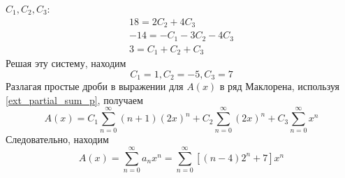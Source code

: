 \begin{task}
\begin{solution}
        $C_1, C_2, C_3$:
        \begin{gather*}
            18 = 2C_2 + 4C_3 \\
            -14 = -C_1 - 3C_2 - 4C_3 \\
            3 = C_1 + C_2 + C_3
        \end{gather*}
        Решая эту систему, находим
        \begin{equation*}
            C_1 = 1, C_2 = -5, C_3 = 7
        \end{equation*}
        Разлагая простые дроби в выражении для $A(x)$ в ряд Маклорена, используя \ref{ext_partial_sum_p},
        получаем
        \begin{equation*}
            A(x) = C_1 \sum_{n = 0}^{\infty} (n+1)(2x)^n + C_2 \sum_{n = 0}^{\infty} (2x)^n + C_3 \sum_{n = 0}^{\infty} x^n
        \end{equation*}
        Следовательно, находим
        \begin{equation*}
            A(x) = \sum_{n = 0}^{\infty} a_n x^n = \sum_{n = 0}^{\infty}\left[(n - 4) 2^n + 7\right] x^n
        \end{equation*}
    \end{solution}
\end{task}

